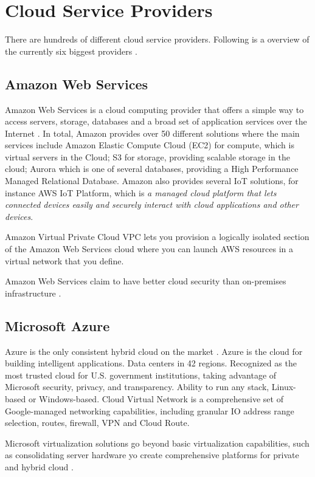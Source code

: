 \chapter{Cloud Service Providers}
There are hundreds of different cloud service providers. Following is a overview of the currently six biggest providers \cite{10biggest} \cite{Forbestop}.

\section{Amazon Web Services}
Amazon Web Services is a cloud computing provider that offers a simple way to access servers, storage, databases and a broad set of application services over the Internet \cite{Amazon}. In total, Amazon provides over 50 different solutions where the main services include  Amazon Elastic Compute Cloud (EC2) for compute, which is virtual servers in the Cloud; S3 for storage, providing scalable storage in the cloud; Aurora which is one of several databases, providing a High Performance Managed Relational Database. Amazon also provides several IoT solutions, for instance AWS IoT Platform, which is \textit{a managed cloud platform that lets connected devices easily and securely interact with cloud applications and other devices}.


Amazon Virtual Private Cloud VPC lets you provision a logically isolated section of the Amazon Web Services cloud where you can launch AWS resources in a virtual network that you define. \cite{predictive}

Amazon Web Services claim to have better cloud security than on-premises infrastructure \cite{Amazon}.

\section{Microsoft Azure}
Azure is the only consistent hybrid cloud on the market \cite{Azure}. Azure is the cloud for building intelligent applications. Data centers in 42 regions. Recognized as the most trusted cloud for U.S. government institutions, taking advantage of Microsoft security, privacy, and transparency. Ability to run any stack, Linux-based or Windows-based. Cloud Virtual Network is a comprehensive set of Google-managed networking capabilities, including granular IO address range selection, routes, firewall, VPN and Cloud Route. 

Microsoft virtualization solutions go beyond basic virtualization capabilities, such as consolidating server hardware yo create comprehensive platforms for private and hybrid cloud \cite{predictive}.  


